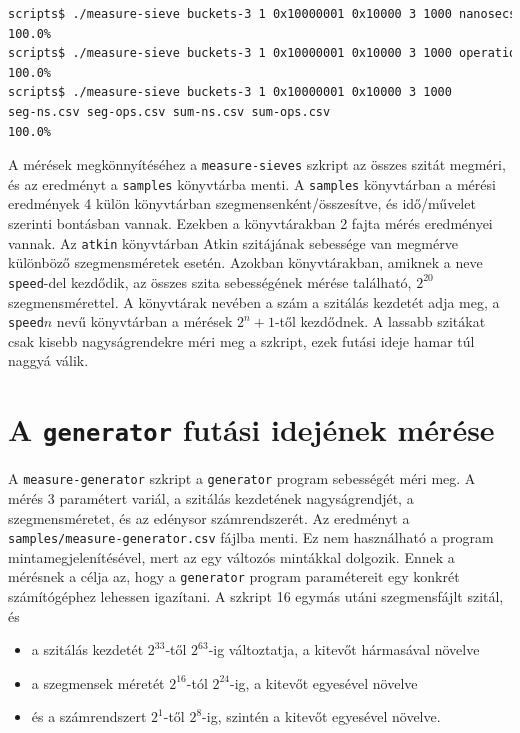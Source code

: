 \begin{lstlisting}[language=bash]
scripts$ ./measure-sieve buckets-3 1 0x10000001 0x10000 3 1000 nanosecs sum out1.csv
100.0%
scripts$ ./measure-sieve buckets-3 1 0x10000001 0x10000 3 1000 operations segment out2.csv
100.0%
scripts$ ./measure-sieve buckets-3 1 0x10000001 0x10000 3 1000
seg-ns.csv seg-ops.csv sum-ns.csv sum-ops.csv
100.0%
\end{lstlisting}

A mérések megkönnyítéséhez a \texttt{measure-sieves} szkript az összes szitát megméri, és az eredményt a \texttt{samples} könyvtárba menti.
A \texttt{samples} könyvtárban a mérési eredmények 4 külön könyvtárban szegmensenként/összesítve, és idő/művelet szerinti bontásban vannak.
Ezekben a könyvtárakban 2 fajta mérés eredményei vannak.
Az \texttt{atkin} könyvtárban Atkin szitájának sebessége van megmérve különböző szegmensméretek esetén.
Azokban könyvtárakban, amiknek a neve \texttt{speed}-del kezdődik, az összes szita sebességének mérése található, $2^{20}$ szegmensmérettel.
A könyvtárak nevében a szám a szitálás kezdetét adja meg, a \texttt{speed}$n$ nevű könyvtárban a mérések $2^n+1$-től kezdődnek.
A lassabb szitákat csak kisebb nagyságrendekre méri meg a szkript, ezek futási ideje hamar túl naggyá válik.

\section{A \texttt{generator} futási idejének mérése}

A \texttt{measure-generator} szkript a \texttt{generator} program sebességét méri meg.
A mérés 3 paramétert variál, a szitálás kezdetének nagyságrendjét, a szegmensméretet, és az edénysor számrendszerét.
Az eredményt a \texttt{samples/measure-generator.csv} fájlba menti.
Ez nem használható a program mintamegjelenítésével, mert az egy változós mintákkal dolgozik.
Ennek a mérésnek a célja az, hogy a \texttt{generator} program paramétereit egy konkrét számítógéphez lehessen igazítani.
A szkript 16 egymás utáni szegmensfájlt szitál, és
\begin{itemize}
\item a szitálás kezdetét $2^{33}$-től $2^{63}$-ig változtatja, a kitevőt hármasával növelve
\item a szegmensek méretét $2^{16}$-tól $2^{24}$-ig, a kitevőt egyesével növelve
\item és a számrendszert $2^1$-től $2^8$-ig, szintén a kitevőt egyesével növelve.
\end{itemize}

